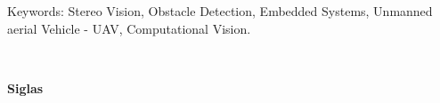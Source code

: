 \vspace{0.05\textheight}

Keywords: Stereo Vision, Obstacle Detection, Embedded Systems, Unmanned aerial Vehicle - UAV, Computational Vision.

\cleardoublepage

\listoffigures %

\listoftables %

\cleardoublepage

\
\vspace{0.11\textheight} 

\textbf{\Huge{Siglas}}

\vspace{0.05\textheight}
			
